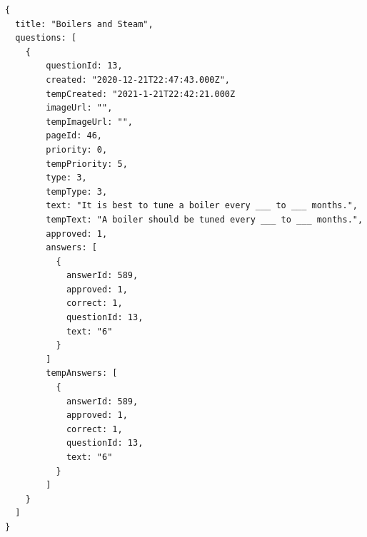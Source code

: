 \documentclass[onecolumn, draftclsnofoot,10pt, compsoc, usenames, dvipsnames]{IEEEtran}
\begin{document}
\begin{lstlisting}[caption=Example Response]
{ 
  title: "Boilers and Steam",
  questions: [
    {
        questionId: 13,
        created: "2020-12-21T22:47:43.000Z",
        tempCreated: "2021-1-21T22:42:21.000Z
        imageUrl: "",
        tempImageUrl: "",
        pageId: 46,
        priority: 0,
        tempPriority: 5,
        type: 3,
        tempType: 3,
        text: "It is best to tune a boiler every ___ to ___ months.",
        tempText: "A boiler should be tuned every ___ to ___ months.",
        approved: 1,
        answers: [
          {
            answerId: 589,
            approved: 1,
            correct: 1,
            questionId: 13,
            text: "6"
          }
        ]
        tempAnswers: [
          {
            answerId: 589,
            approved: 1,
            correct: 1,
            questionId: 13,
            text: "6"
          }
        ]
    }
  ]
}
\end{lstlisting}
\\~\\
\end{document}
